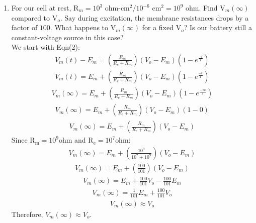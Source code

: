 \documentclass[11pt]{article}
\begin{document}
\begin{enumerate}[label=\arabic*.]
\begin{enumerate}[label=(\alph*)]
\newpage
\item
For our cell at rest, R$_m = 10^3$ ohm-cm$^2 / 10^{-6}$ cm$^2 = 10^9$ ohm. Find V$_m(\infty)$ compared to V$_o$. Say during excitation, the membrane resistances drops by a factor of $100$. What happens to V$_m(\infty)$ for a fixed V$_o$? Is our battery still a constant-voltage source in this case?
\vspace*{1\baselineskip}
\\
We start with Eqn(2):
\begin{align*}
V_m(t) - E_m = \left(\frac{R_m} {R_e+ R_m}\right) \left(V_o - E_m\right) \left(1 - e^{\frac{-t} {T}}\right)
\end{align*}
\begin{align*}
V_m(t) = E_m + \left(\frac{R_m} {R_e+ R_m}\right) \left(V_o - E_m\right) \left(1 - e^{\frac{-t} {T}}\right)
\end{align*}
\begin{align*}
V_m(\infty) = E_m + \left(\frac{R_m} {R_e+ R_m}\right) \left(V_o - E_m\right) \left(1 - e^{\frac{-\infty} {T}}\right)
\end{align*}
\begin{align*}
V_m(\infty) = E_m + \left(\frac{R_m} {R_e+ R_m}\right) \left(V_o - E_m\right) \left(1 - 0\right)
\end{align*}
\begin{align*}
V_m(\infty) = E_m + \left(\frac{R_m} {R_e+ R_m}\right) \left(V_o - E_m\right)
\end{align*}
Since $\text{R}_\text{m} = 10^9 \text{ohm}$ and $\text{R}_\text{e} = 10^7 \text{ohm}$:
\begin{align*}
V_m(\infty) = E_m + \left(\frac{10^9} {10^7 + 10^9}\right) \left(V_o - E_m\right)
\end{align*}
\begin{align*}
V_m(\infty) = E_m + \left(\frac{100} {101}\right) \left(V_o - E_m\right)
\end{align*}
\begin{align*}
V_m(\infty) = E_m + \frac{100} {101} V_o - \frac{100} {101} E_m
\end{align*}
\begin{align*}
V_m(\infty) = \frac{1} {101} E_m + \frac{100} {101} V_o
\end{align*}
\begin{align*}
V_m(\infty) \approx V_o
\end{align*}
Therefore, $V_m(\infty) \approx V_o$.
\vspace*{1\baselineskip}
\\

\end{enumerate}
\end{enumerate}
\end{document}
